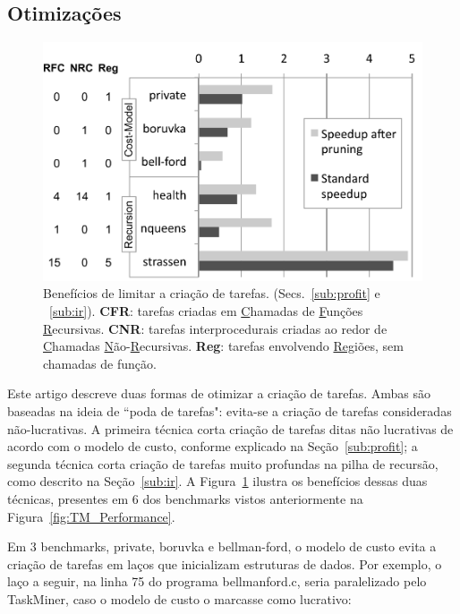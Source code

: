 \documentclass[sigplan,10pt,review]{acmart}
\newcommand\Taskminer{\mbox{\textsf{TaskMiner}}}
\begin{document}
\subsection{Otimizações}
\label{sub:optimizations}

\begin{figure}[b!]
\begin{center}
\includegraphics[width=1\columnwidth]{images/Optimizations}
\caption{Benefícios de limitar a criação de tarefas. (Secs.~\ref{sub:profit} e ~\ref{sub:ir}).
\textbf{CFR}: tarefas criadas em \underline{C}hamadas de \underline{F}unções \underline{R}ecursivas.
\textbf{CNR}: tarefas interprocedurais criadas ao redor de \underline{C}hamadas  \underline{N}ão-\underline{R}ecursivas.
\textbf{Reg}: tarefas envolvendo \underline{Reg}iões, sem chamadas de função.}
\label{fig:Optimizations}
\end{center}
\end{figure}

Este artigo descreve duas formas de otimizar a criação de tarefas. Ambas são baseadas na ideia de 
``poda de tarefas": evita-se a criação de tarefas consideradas não-lucrativas. A primeira técnica
corta criação de tarefas ditas não lucrativas de acordo com o modelo de custo, conforme explicado na 
Seção~\ref{sub:profit}; a segunda técnica corta criação de tarefas muito profundas na pilha de recursão, 
como descrito na Seção~\ref{sub:ir}. A Figura~\ref{fig:Optimizations} ilustra os benefícios dessas duas técnicas,
presentes em 6 dos benchmarks vistos anteriormente na Figura~\ref{fig:TM_Performance}.

Em 3 benchmarks, \textsf{private}, \textsf{boruvka} e
\textsf{bellman-ford}, o modelo de custo evita a criação de tarefas em laços que inicializam estruturas de dados.
Por exemplo, o laço a seguir, na linha 75 do programa \textsf{bellmanford.c}, seria paralelizado pelo
\Taskminer{}, caso o modelo de custo o marcasse como lucrativo:
\end{document}
